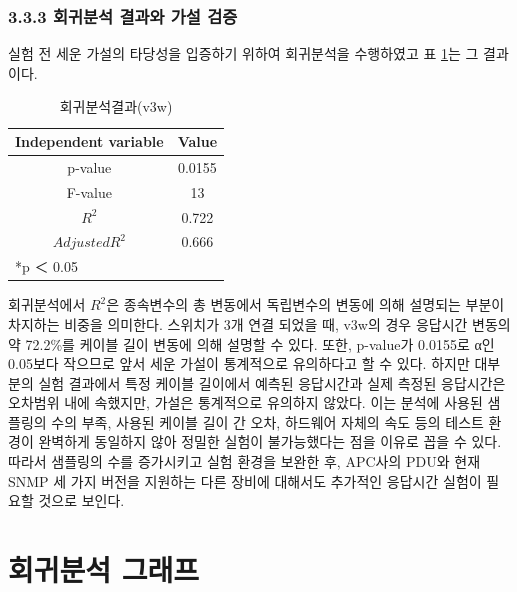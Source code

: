 \documentclass[11pt
  , a4paper
  , article
  , oneside
]{memoir}
\begin{document}
 \subsection{3.3.3 회귀분석 결과와 가설 검증}
 실험 전 세운 가설의 타당성을 입증하기 위하여 회귀분석을 수행하였고 표 \ref{table:regression}는 그 결과이다.
 
\begin{table}[!htb]
\begin{center}
\begin{tabular}{c|c}\hline
Independent variable & Value  \\ \hline\hline
p-value &  0.0155\\ 
F-value &  13\\ 
$  R^2  $ &  0.722\\ 
$ Adjusted R^2 $ & 0.666 \\ \hline
\multicolumn{2}{l}{*p ＜ 0.05} \\ \hline\hline
\end{tabular}
\caption{회귀분석결과(v3w)}
  \label{table:regression}  
\end{center}
\end{table} 
회귀분석에서 $  R^2  $은 종속변수의 총 변동에서 독립변수의 변동에 의해 설명되는 부분이 차지하는 비중을 의미한다. 스위치가 3개 연결 되었을 때, v3w의 경우 응답시간 변동의 약 72.2\%를 케이블 길이 변동에 의해 설명할 수 있다. 또한, p-value가 0.0155로 α인 0.05보다 작으므로 앞서 세운 가설이 통계적으로 유의하다고 할 수 있다. 하지만 대부분의 실험 결과에서 특정 케이블 길이에서 예측된 응답시간과 실제 측정된 응답시간은 오차범위 내에 속했지만, 가설은 통계적으로 유의하지 않았다. 이는 분석에 사용된 샘플링의 수의 부족, 사용된 케이블 길이 간 오차, 하드웨어 자체의 속도 등의 테스트 환경이 완벽하게 동일하지 않아 정밀한 실험이 불가능했다는 점을 이유로 꼽을 수 있다. 따라서 샘플링의 수를 증가시키고 실험 환경을 보완한 후, APC사의 PDU와 현재 SNMP 세 가지 버전을 지원하는 다른 장비에 대해서도 추가적인 응답시간 실험이 필요할 것으로 보인다. 

\clearpage
\appendix
\addappheadtotoc
\renewcommand*\printchaptername{\Large\bfseries\appendixname~}
\chapter{회귀분석 그래프}
\end{document}
